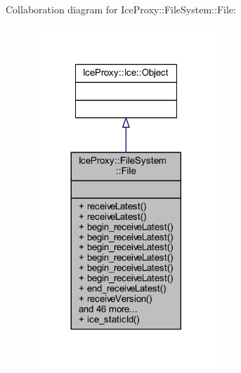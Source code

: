 Collaboration diagram for Ice\+Proxy\+:\+:File\+System\+:\+:File\+:
\nopagebreak
\begin{figure}[H]
\begin{center}
\leavevmode
\includegraphics[width=197pt]{class_ice_proxy_1_1_file_system_1_1_file__coll__graph}
\end{center}
\end{figure}
